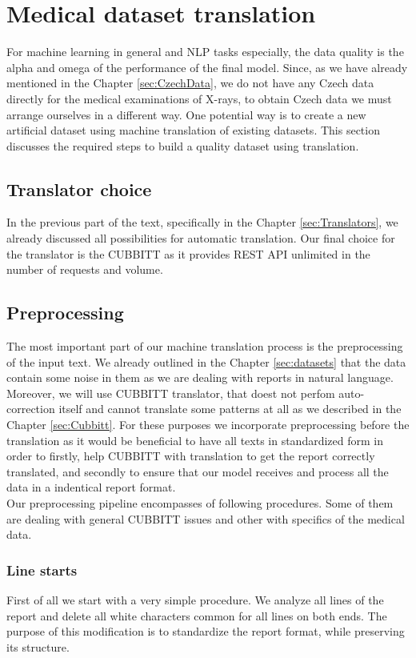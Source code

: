 \section{Medical dataset translation}
For machine learning in general and NLP tasks especially, the data quality is the alpha and omega of the performance of the final model. Since, as we have already mentioned in the Chapter \ref{sec:CzechData}, we do not have any Czech data directly for the medical examinations of X-rays, to obtain Czech data we must arrange ourselves in a different way. One potential way is to create a new artificial dataset using machine translation of existing datasets. This section discusses the required steps to build a quality dataset using translation.

\subsection{Translator choice}
In the previous part of the text, specifically in the Chapter \ref{sec:Translators}, we already discussed all possibilities for automatic translation. Our final choice for the translator is the CUBBITT as it provides REST API unlimited in the number of requests and volume.

\subsection{Preprocessing}
\label{sec:DataPreprocessing}
The most important part of our machine translation process is the preprocessing of the input text. We already outlined in the Chapter \ref{sec:datasets} that the data contain some noise in them as we are dealing with reports in natural language. Moreover, we will use CUBBITT translator, that doest not perfom auto-correction itself and cannot translate some patterns at all as we described in the Chapter \ref{sec:Cubbitt}. For these purposes we incorporate preprocessing before the translation as it would be beneficial to have all texts in standardized form in order to firstly, help CUBBITT with translation to get the report correctly translated, and secondly to ensure that our model receives and process all the data in a indentical report format.\\

Our preprocessing pipeline encompasses of following procedures. Some of them are dealing with general CUBBITT issues and other with specifics of the medical data.

\subsubsection*{Line starts}
First of all we start with a very simple procedure. We analyze all lines of the report and delete all white characters common for all lines on both ends. The purpose of this modification is to standardize the report format, while preserving its structure.

